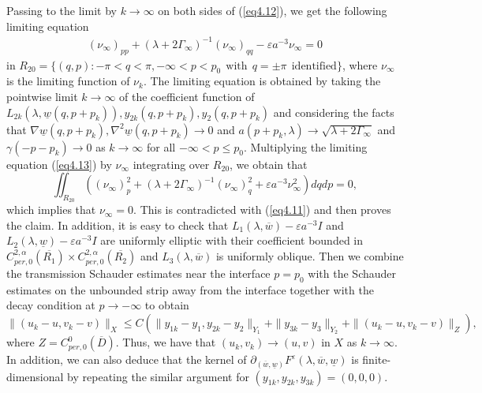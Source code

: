 \documentclass[11pt,reqno]{amsart}
\numberwithin{equation}{section}
\theoremstyle{definition}
\theoremstyle{remark}
\begin{document}
Passing to the limit by $k\rightarrow \infty$ on both sides of
(\ref{eq4.12}), we get the following limiting equation
\begin{eqnarray}
(\nu_{\infty})_{pp}+(\lambda+2\Gamma_{\infty})^{-1}(\nu_{\infty})_{qq}-\varepsilon
a^{-3}\nu_{\infty}=0 \label{eq4.13}
\end{eqnarray}
in $R_{20}=\{(q,p):-\pi<q<\pi, -\infty<p<p_0~~ \text{with}~~ q=\pm
\pi~~ \text{identified}\}$, where $\nu_{\infty}$ is the limiting
function of $\nu_k$. The limiting equation is obtained by taking the
pointwise limit $k\rightarrow \infty$ of the coefficient function of
$L_{2k}(\lambda,\underline{w}(q,p+p_k)), y_{2k}(q,p+p_k),
y_{2}(q,p+p_k)$ and considering the facts that $\nabla
\underline{w}(q, p+p_k), \nabla^2 \underline{w}(q, p+p_k)\rightarrow
0$ and $a(p+p_k,\lambda)\rightarrow \sqrt{\lambda+2\Gamma_{\infty}}$
and $\gamma(-p-p_k)\rightarrow 0$ as $k\rightarrow \infty$ for all
$-\infty<p\leq p_0$. Multiplying the limiting equation
(\ref{eq4.13}) by $\nu_{\infty}$ integrating over $R_{20}$, we
obtain that
$$
\iint_{R_{20}}\left((\nu_{\infty})_p^2+(\lambda+2\Gamma_{\infty})^{-1}(\nu_{\infty})_q^2+\varepsilon
a^{-3}\nu_{\infty}^2\right) dqdp=0,
$$
which implies that $\nu_{\infty}=0$. This is contradicted with
(\ref{eq4.11}) and then proves the claim. In addition, it is easy to
check that $L_1(\lambda,\overline{w})-\varepsilon a^{-3}I$ and
$L_2(\lambda,\underline{w})-\varepsilon a^{-3}I$ are uniformly
elliptic with their coefficient bounded in
$C^{2,\alpha}_{per,0}(\overline{R_1})\times
C^{2,\alpha}_{per,0}(\overline{R_2})$ and
$L_3(\lambda,\overline{w})$ is uniformly oblique. Then we combine
the transmission Schauder estimates near the interface $p=p_0$ \cite[Ladyzhenskaya]{Lady} with the Schauder estimates on the unbounded strip away from the interface together with the decay condition at $p\rightarrow-\infty$ \cite[Agmon-Douglis-Nirenberg]{Agmon} to obtain
$$
\|(u_k-u, v_k-v)\|_X\leq C(\|y_{1k}-y_1,
y_{2k}-y_2\|_{Y_1}+\|y_{3k}-y_3\|_{Y_2}+\|(u_k-u, v_k-v)\|_{Z}),
$$
where $Z=C^{0}_{per,0}(\overline{D})$. Thus, we have that $(u_k,
v_k)\rightarrow (u, v)$ in $X$ as $k\rightarrow\infty$. In addition,
we can also deduce that the kernel of
$\partial_{(\overline{w},\underline{w})}F^{\varepsilon}(\lambda,
\overline{w},\underline{w})$ is finite-dimensional by repeating the
similar argument for $(y_{1k},y_{2k},y_{3k})=(0,0,0)$.
\end{document}
